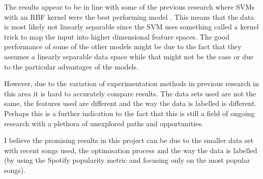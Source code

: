 The results appear to be in line with some of the previous research where SVMs with an RBF kernel were the best performing model \cite{pham2016predicting}. This means that the data is most likely not linearly separable since the SVM uses something called a kernel trick to map the input into higher dimensional feature spaces. The good performance of some of the other models might be due to the fact that they assumes a linearly separable data space while that might not be the case or due to the particular advantages of the models.

However, due to the variation of experimentation methods in previous research in this area it is hard to accurately compare results. The data sets used are not the same, the features used are different and the way the data is labelled is different. Perhaps this is a further indication to the fact that this is still a field of ongoing research with a plethora of unexplored paths and opportunities. 

I believe the promising results in this project can be due to the smaller data set with recent songs used, the optimisation process and the way the data is labelled (by using the Spotify popularity metric and focusing only on the most popular songs).

